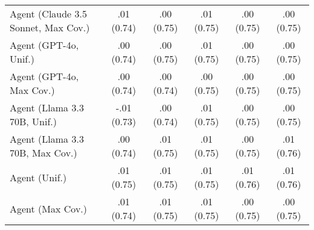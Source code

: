 \begin{table}[h!]
\begin{tabular}{lccccc}
    Agent (Claude 3.5 Sonnet, Max Cov.) & .01 {\small (0.74)} & .00 {\small (0.75)} & .01 {\small (0.75)} & .00 {\small (0.75)} & .00 {\small (0.75)} \\
    Agent (GPT-4o, Unif.) & .00 {\small (0.74)} & .00 {\small (0.75)} & .01 {\small (0.75)} & .00 {\small (0.75)} & .00 {\small (0.75)} \\
    Agent (GPT-4o, Max Cov.) & .00 {\small (0.74)} & .00 {\small (0.74)} & .00 {\small (0.75)} & .00 {\small (0.75)} & .00 {\small (0.75)} \\
    Agent (Llama 3.3 70B, Unif.) & -.01 {\small (0.73)} & .00 {\small (0.74)} & .01 {\small (0.75)} & .00 {\small (0.75)} & .00 {\small (0.75)} \\
    Agent (Llama 3.3 70B, Max Cov.) & .00 {\small (0.74)} & .01 {\small (0.75)} & .01 {\small (0.75)} & .00 {\small (0.75)} & \cellcolor{bronze!30}.01 {\small (0.76)} \\
    Agent (Unif.) & \cellcolor{silver!30}.01 {\small (0.75)} & \cellcolor{bronze!30}.01 {\small (0.75)} & \cellcolor{silver!30}.01 {\small (0.75)} & \cellcolor{gold!30}.01 {\small (0.76)} & .01 {\small (0.76)} \\
    Agent (Max Cov.) & .01 {\small (0.74)} & \cellcolor{silver!30}.01 {\small (0.75)} & \cellcolor{bronze!30}.01 {\small (0.75)} & .00 {\small (0.75)} & .00 {\small (0.75)} \\
    \bottomrule
    \end{tabular}
\end{table}
